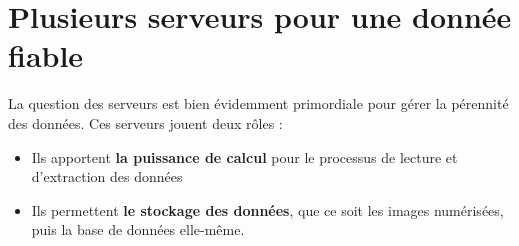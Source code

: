     \section{Plusieurs serveurs pour une donnée fiable}

La question des serveurs est bien évidemment primordiale pour gérer la pérennité des données.  Ces serveurs jouent deux rôles :
\begin{itemize}[label=\textbullet]
    \item Ils apportent \textbf{la puissance de calcul} pour le processus de lecture et d’extraction des données
    \item Ils permettent \textbf{le stockage des données}, que ce soit les images numérisées, puis la base de données elle-même.
\end{itemize}

